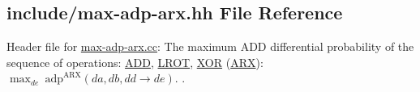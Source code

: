 \hypertarget{max-adp-arx_8hh}{\subsection{include/max-\/adp-\/arx.hh \-File \-Reference}
\label{max-adp-arx_8hh}
}


\-Header file for \hyperlink{max-adp-arx_8cc}{max-\/adp-\/arx.\-cc}\-: \-The maximum \-A\-D\-D differential probability of the sequence of operations\-: \hyperlink{common_8hh_af3b709fb668cf93ca09e2a46a2a031a8}{\-A\-D\-D}, \hyperlink{common_8hh_abe2030c44a97657e1b1dbe9b0e093a7b}{\-L\-R\-O\-T}, \hyperlink{common_8hh_a6de9ec3b3b57377b69a82239ea52ec6e}{\-X\-O\-R} (\hyperlink{common_8hh_a7d3da57c58af293c7c57e4f1b551849d}{\-A\-R\-X})\-: $\max_{de}~\mathrm{adp}^{\mathrm{ARX}}(da,db,dd \rightarrow de)$. .  


